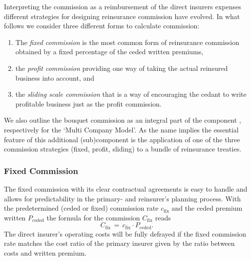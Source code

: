 Interpreting the commission as a reimbursement of the direct insurers expenses
different strategies for designing reinsurance commission have evolved.
In what follows we consider three different forms to calculate commission:
\begin{enumerate}
    \item The {\em fixed commission} is the most common form of reinsurance commission obtained by 
    a fixed percentage of the ceded written premiums,
    \item the {\em profit commission} providing one way of taking the actual reinsured business into account, and
    \item the {\em sliding scale commission} that is a way of encouraging the cedant to write profitable business just as the profit commission.
\end{enumerate}

We also outline the bouquet commission as an
integral part of the component , respectively 
 for the `Multi Company Model'.  
As the name implies the essential feature of this additional (sub)component
is the application of one of the three commission strategies (fixed, profit, sliding) 
to a bundle of reinsurance treaties.


\subsubsection{Fixed Commission}
\label{subsubsec:fixedCommission}

The fixed commission  with its clear contractual agreements is easy to handle and allows for predictability in the
primary- and reinsurer's planning process. With the predetermined (ceded or fixed) commission rate $c_{\mathrm{fix}}$
and the ceded premium written $P_{\mathrm{ceded}}$ the formula
for the commission $C_{\mathrm{fix}}$ reads
\begin{equation}\label{eq:fixedCom}
  C_{\mathrm{fix}}\,=\, c_{\mathrm{fix}}\cdot P_{\mathrm{ceded}}.
\end{equation}
The direct insurer's operating costs will be fully defrayed if the fixed commission rate matches the 
cost ratio of the primary insurer given by the ratio between costs and written premium.


